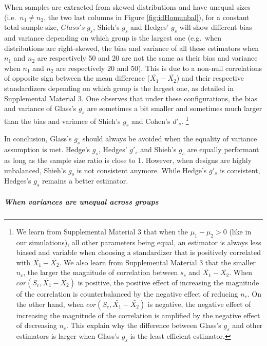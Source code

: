 \documentclass[
  man,floatsintext]{apa6}
\begin{document}
When samples are extracted from skewed distributions and have unequal sizes (i.e.~\(n_1 \neq n_2\), the two last columns in Figure \ref{fig:idHomunbal}), for a constant total sample size, \(Glass's \; g_s\), Shieh's \(g_s\) and Hedges' \(g_s\) will show different bias and variance depending on which group is the largest one (e.g.~when distributions are right-skewed, the bias and variance of all these estimators when \(n_1\) and \(n_2\) are respectively 50 and 20 are not the same as their bias and variance when \(n_1\) and \(n_2\) are respectively 20 and 50). This is due to a non-null correlations of opposite sign between the mean difference (\(\bar{X_1}-\bar{X_2}\)) and their respective standardizers depending on which group is the largest one, as detailed in Supplemental Material 3. One observes that under these configurations, the bias and variance of Glass's \(g_s\) are sometimes a bit smaller and sometimes much larger than the bias and variance of Shieh's \(g_s\) and Cohen's \(d'_s\). \footnote{We learn from Supplemental Material 3 that when the $\mu_1-\mu_2 >0$ (like in our simulations), all other parameters being equal, an estimator is always less biased and variable when choosing a standardizer that is positively correlated with $\bar{X_1}-\bar{X_2}$. We also learn from Supplemental Material 3 that the smaller $n_c$, the larger the magnitude of correlation between $s_c$ and $\bar{X_1}-\bar{X_2}$. When $cor(S_c,\bar{X_1}-\bar{X_2})$ is positive, the positive effect of increasing the magnitude of the correlation is counterbalanced by the negative effect of reducing $n_c$. On the other hand, when $cor(S_c,\bar{X_1}-\bar{X_2})$ is negative, the negative effect of increasing the magnitude of the correlation is amplified by the negative effect of decreasing $n_c$. This explain why the difference between Glass's $g_s$ and other estimators is larger when Glass's $g_s$ is the least efficient estimator.}

In conclusion, Glass's \(g_s\) should always be avoided when the equality of variance assumption is met. Hedge's \(g_s\), Hedges' \(g'_s\) and Shieh's \(g_s\) are equally performant as long as the sample size ratio is close to 1. However, when designs are highly unbalanced, Shieh's \(g_s\) is not consistent anymore. While Hedge's \(g'_s\) is consistent, Hedges's \(g_s\) remains a better estimator.

\hypertarget{when-variances-are-unequal-across-groups}{%
\subparagraph{When variances are unequal across groups}\label{when-variances-are-unequal-across-groups}}
\end{document}
